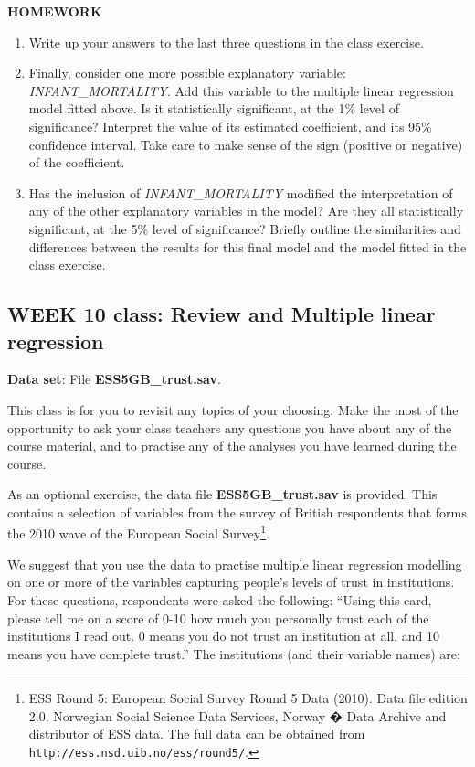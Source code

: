 \documentclass[11pt,a4paper,openany]{book}
\let\rmarkdownfootnote\footnote%
\def\footnote{\protect\rmarkdownfootnote}
\begin{document}
\textbf{HOMEWORK}

\begin{enumerate}
\def\labelenumi{\arabic{enumi}.}
\item
  Write up your answers to the last three questions in the class
  exercise.
\item
  Finally, consider one more possible explanatory variable:
  \emph{INFANT\_MORTALITY}. Add this variable to the multiple linear
  regression model fitted above. Is it statistically significant, at the
  1\% level of significance? Interpret the value of its estimated
  coefficient, and its 95\% confidence interval. Take care to make sense
  of the sign (positive or negative) of the coefficient.
\item
  Has the inclusion of \emph{INFANT\_MORTALITY} modified the
  interpretation of any of the other explanatory variables in the model?
  Are they all statistically significant, at the 5\% level of
  significance? Briefly outline the similarities and differences between
  the results for this final model and the model fitted in the class
  exercise.
\end{enumerate}

\newpage

\subsection{WEEK 10 class: Review and Multiple linear
regression}\label{week-10-class-review-and-multiple-linear-regression}

\textbf{Data set}: File \textbf{ESS5GB\_trust.sav}.

This class is for you to revisit any topics of your choosing. Make the
most of the opportunity to ask your class teachers any questions you
have about any of the course material, and to practise any of the
analyses you have learned during the course.

As an optional exercise, the data file \textbf{ESS5GB\_trust.sav} is
provided. This contains a selection of variables from the survey of
British respondents that forms the 2010 wave of the European Social
Survey\footnote{ESS Round 5: European Social Survey Round 5 Data (2010).
  Data file edition 2.0. Norwegian Social Science Data Services, Norway
  � Data Archive and distributor of ESS data. The full data can be
  obtained from \texttt{http://ess.nsd.uib.no/ess/round5/}.}.

We suggest that you use the data to practise multiple linear regression
modelling on one or more of the variables capturing people's levels of
trust in institutions. For these questions, respondents were asked the
following: ``Using this card, please tell me on a score of 0-10 how much
you personally trust each of the institutions I read out. 0 means you do
not trust an institution at all, and 10 means you have complete trust.''
The institutions (and their variable names) are:
\end{document}
